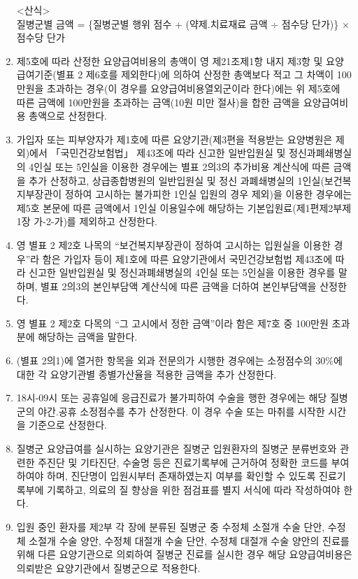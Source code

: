 \begin{enumerate}[1.]
<산식>\\
질병군별 금액 = \{질병군별 행위 점수 + (약제.치료재료 금액 ÷ 점수당 단가)\} × 점수당 단가
\item 제5호에 따라 산정한 요양급여비용의 총액이 영 제21조제1항 내지 제3항 및 요양급여기준(별표 2 제6호를 제외한다)에 의하여 산정한 총액보다 적고 그 차액이 100만원을 초과하는 경우(이 경우를 요양급여비용열외군이라 한다)에는 위 제5호에 따른 금액에 100만원을 초과하는 금액(10원 미만 절사)을 합한 금액을 요양급여비용 총액으로 산정한다.
\item 가입자 또는 피부양자가 제1호에 따른 요양기관(제3편을 적용받는 요양병원은 제외)에서 「국민건강보험법」 제43조에 따라 신고한 일반입원실 및 정신과폐쇄병실의 4인실 또는 5인실을 이용한 경우에는 별표 2의3의 추가비용 계산식에 따른 금액을 추가 산정하고, 상급종합병원의 일반입원실 및 정신 과폐쇄병실의 1인실(보건복지부장관이 정하여 고시하는 불가피한
1인실 입원의 경우 제외)을 이용한 경우에는 제5호 본문에 따른 금액에서
1인실 이용일수에 해당하는 기본입원료(제1편제2부제1장 가-2-가)를
제외하고 산정한다.
\item 영 별표 2 제2호 나목의 “보건복지부장관이 정하여 고시하는 입원실을
이용한 경우”라 함은 가입자 등이 제1호에 따른 요양기관에서 국민건강보험법
제43조에 따라 신고한 일반입원실 및 정신과폐쇄병실의 4인실 또는 5인실을
이용한 경우를 말하며, 별표 2의3의 본인부담액 계산식에 따른 금액을 더하여
본인부담액을 산정한다.
\item 영 별표 2 제2호 다목의 “그 고시에서 정한 금액”이라 함은 제7호 중
100만원 초과분에 해당하는 금액을 말한다.
\item (별표 2의1)에 열거한 항목을 외과 전문의가 시행한 경우에는 소정점수의
30\%에 대한 각 요양기관별 종별가산율을 적용한 금액을 추가 산정한다.
\item 18시-09시 또는 공휴일에 응급진료가 불가피하여 수술을 행한 경우에는
해당 질병군의 야간.공휴 소정점수를 추가 산정한다. 이 경우 수술 또는
마취를 시작한 시간을 기준으로 산정한다.
\item 질병군 요양급여를 실시하는 요양기관은 질병군 입원환자의 질병군
분류번호와 관련한 주진단 및 기타진단, 수술명 등은 진료기록부에 근거하여
정확한 코드를 부여하여야 하며, 진단명이 입원시부터 존재하였는지 여부를
확인할 수 있도록 진료기록부에 기록하고, 의료의 질 향상을 위한
점검표를 별지 서식에 따라 작성하여야 한다.
\item 입원 중인 환자를 제2부 각 장에 분류된 질병군 중 수정체 소절개 수술 단안,
수정체 소절개 수술 양안, 수정체 대절개 수술 단안, 수정체 대절개 수술
양안의 진료를 위해 다른 요양기관으로 의뢰하여 질병군 진료를 실시한
경우 해당 요양급여비용은 의뢰받은 요양기관에서 질병군으로 적용한다.

\end{enumerate}
